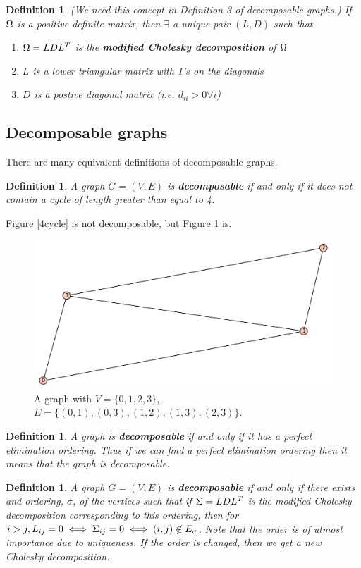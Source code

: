 \documentclass[12pt, leqno]{article}
\def\s{\ensuremath\Sigma}
\def\om{\ensuremath\Omega}
\newtheorem{defn}[thm]{Definition}
\begin{document}
\begin{defn} (We need this concept in
Definition 3 of decomposable graphs.) If $\om$ is a positive definite
matrix, then $\exists$ a unique pair $(L,D)$ such that
\begin{enumerate}
\item $\om = LDL^T$ is the \textbf{modified Cholesky decomposition} of $\om$
\item $L$ is a lower triangular matrix with 1's on the diagonals 
\item $D$ is a postive diagonal matrix (i.e. $d_{ii}>0 \forall i$)
\end{enumerate}
\end{defn}
\subsection{Decomposable graphs} There are many equivalent
definitions of decomposable graphs.
\begin{defn}A graph $G=(V,E)$ is \textbf{decomposable} if and
only if it does not contain a cycle of length greater than equal to 4.
\end{defn}
Figure \ref{4cycle} is not decomposable, but Figure \ref{decomp4} is.
\begin{figure}
\begin{center}
  \includegraphics [scale=0.4]{h06.pdf}
\end{center}
  \caption{A graph with $V = \{0,1,2,3\}$, $E =
    \{(0,1),(0,3),(1,2),(1,3),(2,3)\}$.}
\label{decomp4}
\end{figure}
\begin{defn}A graph is \textbf{decomposable} if and only if it
has a perfect elimination ordering. Thus if we can find a perfect
elimination ordering then it means that the graph is decomposable. 
\end{defn}
\begin{defn}
\label{defn:decompldl}
A graph $G = (V,E)$ is \textbf{decomposable} if and only if there exists
and ordering, $\sigma$, of the vertices such that if $\s = LDL^T$ is the modified
Cholesky decomposition corresponding to this ordering, then for $i>j,
L_{ij} = 0 \iff \s_{ij} = 0 \iff (i,j) \not\in E_{\sigma}$. Note that
the order is of utmost importance due to uniqueness. If the order is
changed, then we get a new Cholesky decomposition. 
\end{defn}
\end{document}
